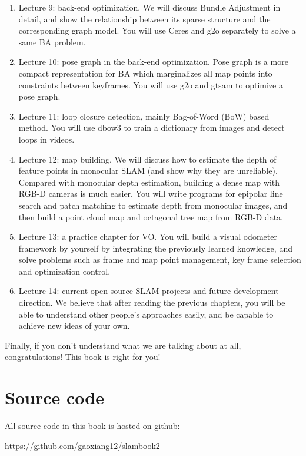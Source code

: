 \begin{enumerate}
	\item Lecture 9: back-end optimization. We will discuss Bundle Adjustment in detail, and show the relationship between its sparse structure and the corresponding graph model. You will use Ceres and g2o separately to solve a same BA problem.
	
	\item Lecture 10: pose graph in the back-end optimization. Pose graph is a more compact representation for BA which marginalizes all map points into constraints between keyframes. You will use g2o and gtsam to optimize a pose graph.
	
	\item Lecture 11: loop closure detection, mainly Bag-of-Word (BoW) based method. You will use dbow3 to train a dictionary from images and detect loops in videos. 
	
	\item Lecture 12: map building. We will discuss how to estimate the depth of feature points in monocular SLAM  (and show why they are unreliable). Compared with monocular depth estimation, building a dense map with RGB-D cameras is much easier. You will write programs for epipolar line search and patch matching to estimate depth from monocular images, and then build a point cloud map and octagonal tree map from RGB-D data.
	
	\item Lecture 13: a practice chapter for VO. You will build a visual odometer framework by yourself by integrating the previously learned knowledge, and solve problems such as frame and map point management, key frame selection and optimization control.
	
	\item Lecture 14: current open source SLAM projects and future development direction. We believe that after reading the previous chapters, you will be able to understand other people's approaches easily, and be capable to achieve new ideas of your own.
\end{enumerate}

Finally, if you don't understand what we are talking about at all, congratulations! This book is right for you! 

\section{Source code}

All source code in this book is hosted on github: 

{\hfill\url{https://github.com/gaoxiang12/slambook2}\hfill}

